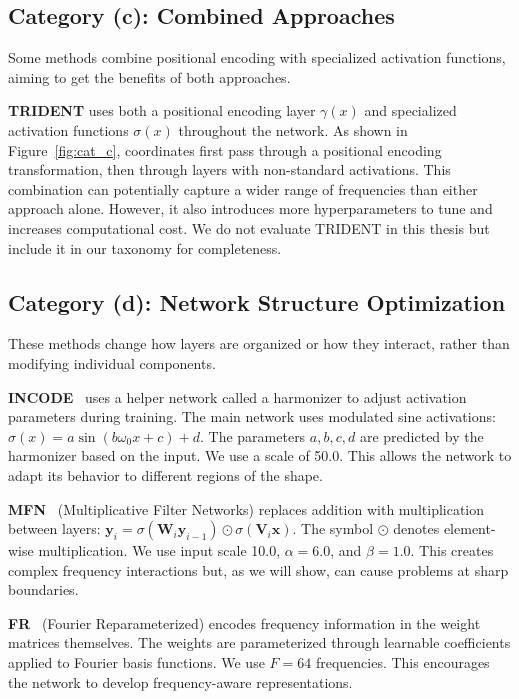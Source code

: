 \subsection{Category (c): Combined Approaches}

Some methods combine positional encoding with specialized activation functions, aiming to get the benefits of both approaches.

\textbf{TRIDENT} uses both a positional encoding layer $\gamma(x)$ and specialized activation functions $\sigma(x)$ throughout the network. As shown in Figure~\ref{fig:cat_c}, coordinates first pass through a positional encoding transformation, then through layers with non-standard activations. This combination can potentially capture a wider range of frequencies than either approach alone. However, it also introduces more hyperparameters to tune and increases computational cost. We do not evaluate TRIDENT in this thesis but include it in our taxonomy for completeness.
\subsection{Category (d): Network Structure Optimization}

These methods change how layers are organized or how they interact, rather than modifying individual components.

\textbf{INCODE}~\cite{kazerouni2024incode} uses a helper network called a harmonizer to adjust activation parameters during training. The main network uses modulated sine activations: $\sigma(x) = a \sin(b\omega_0 x + c) + d$. The parameters $a, b, c, d$ are predicted by the harmonizer based on the input. We use a scale of 50.0. This allows the network to adapt its behavior to different regions of the shape.

\textbf{MFN}~\cite{fathony2021mfn} (Multiplicative Filter Networks) replaces addition with multiplication between layers: $\mathbf{y}_i = \sigma(\mathbf{W}_i \mathbf{y}_{i-1}) \odot \sigma(\mathbf{V}_i \mathbf{x})$. The symbol $\odot$ denotes element-wise multiplication. We use input scale 10.0, $\alpha = 6.0$, and $\beta = 1.0$. This creates complex frequency interactions but, as we will show, can cause problems at sharp boundaries.

\textbf{FR}~\cite{shi2024fr} (Fourier Reparameterized) encodes frequency information in the weight matrices themselves. The weights are parameterized through learnable coefficients applied to Fourier basis functions. We use $F = 64$ frequencies. This encourages the network to develop frequency-aware representations.


